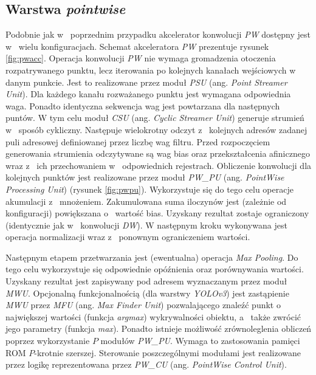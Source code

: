 \subsection{Warstwa \emph{pointwise}}
Podobnie jak w~ poprzednim przypadku akcelerator konwolucji \emph{PW} dostępny jest w~ wielu konfiguracjach.
Schemat akceleratora \emph{PW} prezentuje rysunek \ref{fig:pwacc}.
Operacja konwolucji \emph{PW} nie wymaga gromadzenia otoczenia rozpatrywanego punktu, lecz iterowania po kolejnych kanałach wejściowych w~ danym punkcie.
Jest to realizowane przez moduł \emph{PSU} (ang. \emph{Point Streamer Unit}).
Dla każdego kanału rozważanego punktu jest wymagana odpowiednia waga.
Ponadto identyczna sekwencja wag jest powtarzana dla następnych puntów.
W tym celu moduł \emph{CSU} (ang. \emph{Cyclic Streamer Unit}) generuje strumień w~ sposób cykliczny.
Następuje wielokrotny odczyt z~ kolejnych adresów zadanej puli adresowej definiowanej przez liczbę wag filtru. 
Przed rozpoczęciem generowania strumienia odczytywane są wag bias oraz przekształcenia afinicznego wraz z~ ich przechowaniem w~ odpowiednich rejestrach.
Obliczenie konwolucji dla kolejnych punktów jest realizowane przez moduł \emph{PW\_PU} (ang. \emph{PointWise Processing Unit}) (rysunek \ref{fig:pwpu}).
Wykorzystuje się do tego celu operacje akumulacji z~ mnożeniem.
Zakumulowana suma iloczynów jest (zależnie od konfiguracji) powiększana o~ wartość bias.
Uzyskany rezultat zostaje ograniczony (identycznie jak w~ konwolucji \emph{DW}).
W następnym kroku wykonywana jest operacja normalizacji wraz z~ ponownym ograniczeniem wartości.

Następnym etapem przetwarzania jest (ewentualna) operacja \emph{Max Pooling}.
Do tego celu wykorzystuje się odpowiednie opóźnienia oraz porównywania wartości.
Uzyskany rezultat jest zapisywany pod adresem wyznaczanym przez moduł \emph{MWU}.
Opcjonalną funkcjonalnością (dla warstwy \emph{YOLOv3}) jest zastąpienie \emph{MWU} przez \emph{MFU} (ang. \emph{Max Finder Unit}) pozwalającego znaleźć punkt o~ największej wartości (funkcja \emph{argmax}) wykrywalności obiektu, a~ także zwrócić jego parametry (funkcja \emph{max}).
Ponadto istnieje możliwość zrównoleglenia obliczeń poprzez wykorzystanie $P$ modułów \emph{PW\_PU}. 
Wymaga to zastosowania pamięci ROM $P$-krotnie szerszej. 
Sterowanie poszczególnymi modułami jest realizowane przez logikę reprezentowana przez \emph{PW\_CU} (ang. \emph{PointWise Control Unit}).

